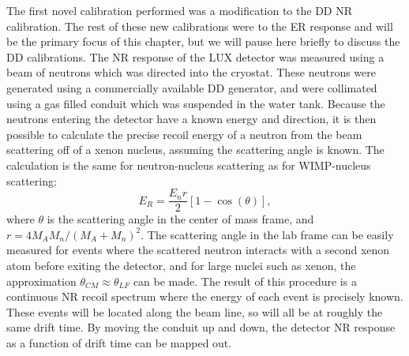 The first novel calibration performed was a modification to the DD NR calibration. The rest of these new calibrations were to the ER response and will be the primary focus of this chapter, but we will pause here briefly to discuss the DD calibrations. The NR response of the LUX detector was measured using a beam of neutrons which was directed into the cryostat. These neutrons were generated using a commercially available DD generator, and were collimated using a gas filled conduit which was suspended in the water tank. Because the neutrons entering the detector have a known energy and direction, it is then possible to calculate the precise recoil energy of a neutron from the beam scattering off of a xenon nucleus, assuming the scattering angle is known. The calculation is the same for neutron-nucleus scattering as for WIMP-nucleus scattering:
\begin{equation}
E_R=\frac{E_nr}{2}[1-\cos(\theta)],
\end{equation}
where $\theta$ is the scattering angle in the center of mass frame, and $r=4M_AM_n/(M_A+M_n)^2$. The scattering angle in the lab frame can be easily measured for events where the scattered neutron interacts with a second xenon atom before exiting the detector, and for large nuclei such as xenon, the approximation $\theta_{CM}\approx \theta_{LF}$ can be made. The result of this procedure is a continuous NR recoil spectrum where the energy of each event is precisely known. These events will be located along the beam line, so will all be at roughly the same drift time. By moving the conduit up and down, the detector NR response as a function of drift time can be mapped out\cite{lux_dd1,lux_dd2}.
